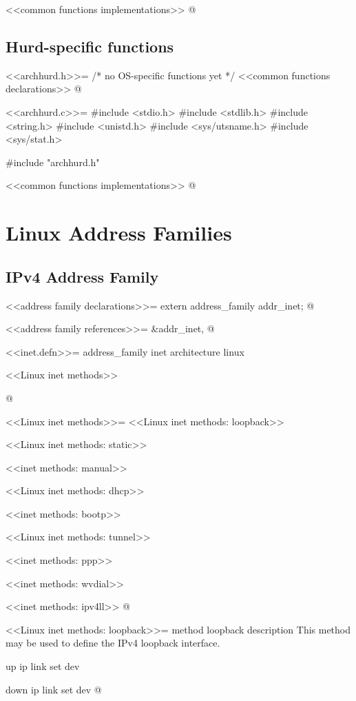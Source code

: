 \documentclass{article}
\begin{document}
<<common functions implementations>>
@ 

\subsection{Hurd-specific functions}

<<archhurd.h>>=
/* no OS-specific functions yet */
<<common functions declarations>>
@

<<archhurd.c>>=
#include <stdio.h>
#include <stdlib.h>
#include <string.h>
#include <unistd.h>
#include <sys/utsname.h>
#include <sys/stat.h>

#include "archhurd.h"

<<common functions implementations>>
@ 

\section{Linux Address Families}
\subsection{IPv4 Address Family}

<<address family declarations>>=
extern address_family addr_inet;
@ 

<<address family references>>=
&addr_inet, 
@ 

<<inet.defn>>=
address_family inet
architecture linux

<<Linux inet methods>>

@ 

<<Linux inet methods>>=
<<Linux inet methods: loopback>>

<<Linux inet methods: static>>

<<inet methods: manual>>

<<Linux inet methods: dhcp>>

<<inet methods: bootp>>

<<Linux inet methods: tunnel>>

<<inet methods: ppp>>

<<inet methods: wvdial>>

<<inet methods: ipv4ll>>
@ 

<<Linux inet methods: loopback>>=
method loopback
  description
    This method may be used to define the IPv4 loopback interface.

  up
    ip link set dev %

  down
    ip link set dev %
@ 
\end{document}
